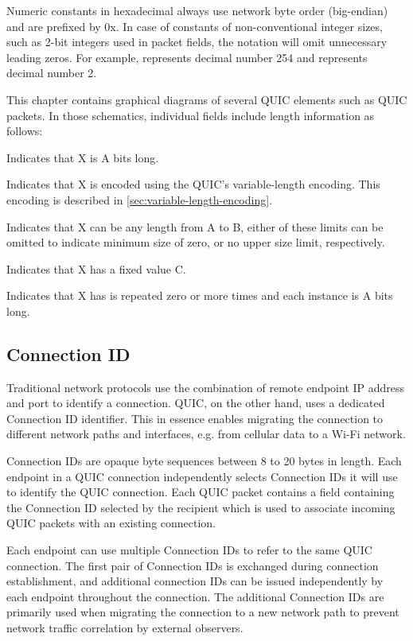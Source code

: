 Numeric constants in hexadecimal always use network byte order (big-endian) and are prefixed by 0x.
In case of constants of non-conventional integer sizes, such as 2-bit integers used in packet
fields, the notation will omit unnecessary leading zeros. For example,  represents
decimal number 254 and  represents decimal number 2.

This chapter contains graphical diagrams of several QUIC elements such as QUIC packets. In those
schematics, individual fields include length information as follows:

\begin{itemize}

   Indicates that X is A bits long.

   Indicates that X is encoded using the QUIC's variable-length encoding. This encoding is described in \autoref{sec:variable-length-encoding}.

   Indicates that X can be any length from A to B, either of these limits can be omitted to indicate minimum size of zero, or no upper size limit, respectively.

   Indicates that X has a fixed value C.

   Indicates that X has is repeated zero or more times and each instance is A bits long.

\end{itemize}

\subsection{Connection ID}

Traditional network protocols use the combination of remote endpoint IP address and port to identify
a connection. QUIC, on the other hand, uses a dedicated Connection ID identifier. This in essence
enables migrating the connection to different network paths and interfaces, e.g. from cellular data
to a Wi-Fi network.

Connection IDs are opaque byte sequences between 8 to 20 bytes in length. Each endpoint in a QUIC
connection independently selects Connection IDs it will use to identify the QUIC connection. Each
QUIC packet contains a field containing the Connection ID selected by the recipient which is used to
associate incoming QUIC packets with an existing connection.

Each endpoint can use multiple Connection IDs to refer to the same QUIC connection. The first pair
of Connection IDs is exchanged during connection establishment, and additional connection IDs can be
issued independently by each endpoint throughout the connection. The additional Connection IDs are
primarily used when migrating the connection to a new network path to prevent network traffic
correlation by external observers.

